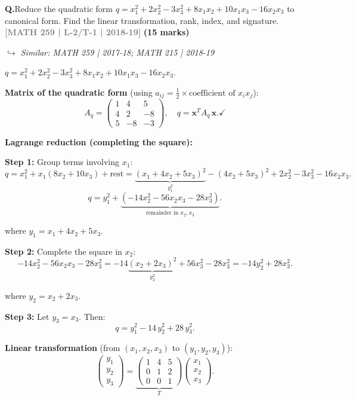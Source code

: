 \documentclass[12pt,a3paper]{article}
\newcommand{\yr}[1]{\hfill\textcolor{gray}{\small\textbf{[#1]}}}
\newcommand{\mk}[1]{\textcolor{orange!70!black}{\small\textbf{(#1 marks)}}}
\newcommand{\variant}[1]{\par\vspace{1pt}\textcolor{blue!50!black}%
  {\footnotesize\textit{$\hookrightarrow$ Similar: #1}}}
\newcounter{qnum}
\newcommand{\Q}[1]{%
  \needspace{4\baselineskip}
  \refstepcounter{qnum}
  \vspace{6pt}
  \noindent\textbf{Q\theqnum.}\enspace #1\par
}
\begin{document}
\Q{Reduce the quadratic form $q = x_1^2 + 2x_2^2 - 3x_3^2 + 8x_1x_2 + 10x_1x_3 - 16x_2x_3$ to canonical form. Find the linear transformation, rank, index, and signature.
\yr{MATH 259 | L-2/T-1 | 2018-19} \mk{15}
\variant{MATH 259 | 2017-18; MATH 215 | 2018-19}}

\begin{tcolorbox}[enhanced,breakable,
  colback=cE!4,colframe=cE,boxrule=0.8pt,arc=5pt,
  title={\textbf{Answer --- Quadratic Form: Canonical Reduction, Rank, Index, Signature}},
  fonttitle=\bfseries\color{white},colbacktitle=cE]
 
$q = x_1^2+2x_2^2-3x_3^2+8x_1x_2+10x_1x_3-16x_2x_3$.
 
\textbf{Matrix of the quadratic form} (using $a_{ij}=\tfrac{1}{2}\times\text{coefficient of }x_ix_j$):
\[
A_q = \begin{pmatrix}1&4&5\\4&2&-8\\5&-8&-3\end{pmatrix}, \quad
q = \mathbf{x}^T A_q\,\mathbf{x}. \checkmark
\]
 
\medskip
\textbf{Lagrange reduction (completing the square):}
 
\textbf{Step 1:} Group terms involving $x_1$:
\[
q = x_1^2 + x_1(8x_2+10x_3) + \text{rest} = \underbrace{(x_1+4x_2+5x_3)^2}_{y_1^2} - (4x_2+5x_3)^2 + 2x_2^2-3x_3^2-16x_2x_3.
\]
\[
q = y_1^2 + \underbrace{(-14x_2^2-56x_2x_3-28x_3^2)}_{\text{remainder in }x_2,x_3}.
\]
 
where $y_1 = x_1+4x_2+5x_3$.
 
\textbf{Step 2:} Complete the square in $x_2$:
\[
-14x_2^2-56x_2x_3-28x_3^2 = -14\underbrace{(x_2+2x_3)^2}_{y_2^2} + 56x_3^2-28x_3^2 = -14y_2^2 + 28x_3^2.
\]
 
where $y_2 = x_2+2x_3$.
 
\textbf{Step 3:} Let $y_3=x_3$. Then:
\[
\boxed{q = y_1^2 - 14\,y_2^2 + 28\,y_3^2.}
\]
 
\medskip
\textbf{Linear transformation} (from $(x_1,x_2,x_3)$ to $(y_1,y_2,y_3)$):
\[
\begin{pmatrix}y_1\\y_2\\y_3\end{pmatrix}
= \underbrace{\begin{pmatrix}1&4&5\\0&1&2\\0&0&1\end{pmatrix}}_{T}
\begin{pmatrix}x_1\\x_2\\x_3\end{pmatrix}.
\]
 

\end{tcolorbox}
\end{document}
